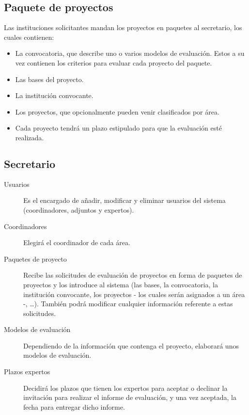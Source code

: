 \documentclass[11pt,a4paper,spanish,twoside]{book}
\begin{document}
\subsection{Paquete de proyectos}
Las instituciones solicitantes mandan los proyectos en paquetes al
secretario, los cuales contienen: 
\begin{itemize}
\item La convocatoria, que describe uno o varios modelos de
  evaluación. Estos a su vez contienen los criterios para evaluar cada
  proyecto del paquete.

\item Las bases del proyecto.

\item La institución convocante.

\item Los proyectos, que opcionalmente pueden venir clasificados por área. 

\item Cada proyecto tendrá un plazo estipulado para que la evaluación esté
  realizada. 
\end{itemize}

\subsection{Secretario}
\begin{description}
\item[Usuarios] Es el encargado de añadir, modificar y eliminar 
  usuarios del sistema (coordinadores, adjuntos y expertos).
\item[Coordinadores] Elegirá el coordinador de cada área.
\item[Paquetes de proyecto] Recibe las solicitudes de evaluación de proyectos
  en forma de paquetes de proyectos y los introduce al sistema (las bases, la
  convocatoria, la institución convocante, los proyectos - los cuales serán
  asignados a un área -, \dots). También podrá modificar cualquier información
  referente a estas solicitudes.  
\item[Modelos de evaluación] Dependiendo de la información que contenga el
  proyecto, elaborará unos modelos de evaluación. 
\item[Plazos expertos] Decidirá los plazos que tienen los expertos para
  aceptar o declinar la invitación para realizar el informe de evaluación,
  y una vez aceptada, la fecha para entregar dicho informe.
\end{description}
\end{document}
